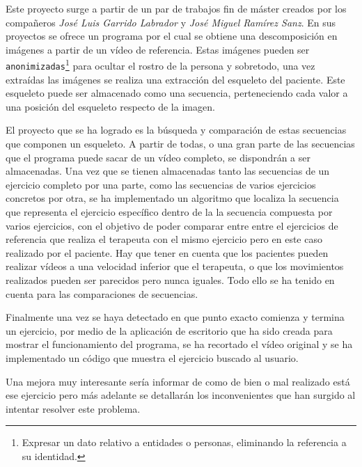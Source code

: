 Este proyecto surge a partir de un par de trabajos fin de máster creados por los compañeros \textit{José Luis Garrido Labrador} y \textit{José Miguel Ramírez Sanz}. En sus proyectos se ofrece un programa por el cual se obtiene una descomposición en imágenes a partir de un vídeo de referencia. Estas imágenes pueden ser \texttt{anonimizadas}\footnote{ Expresar un dato relativo a entidades o personas, eliminando la referencia a su identidad.} para ocultar el rostro de la persona y sobretodo, una vez extraídas las imágenes se realiza una extracción del esqueleto del paciente. Este esqueleto puede ser almacenado como una secuencia, perteneciendo cada valor a una posición del esqueleto respecto de la imagen. 

El proyecto que se ha logrado es la búsqueda y comparación de estas secuencias que componen un esqueleto. A partir de todas, o una gran parte de las secuencias que el programa puede sacar de un vídeo completo, se dispondrán a ser almacenadas. Una vez que se tienen almacenadas tanto las secuencias de un ejercicio completo por una parte, como las secuencias de varios ejercicios concretos por otra, se ha implementado un algoritmo que localiza la secuencia que representa el ejercicio específico dentro de la la secuencia compuesta por varios ejercicios, con el objetivo de poder comparar entre entre el ejercicios de referencia que realiza el terapeuta con el mismo ejercicio pero en este caso realizado por el paciente. Hay que tener en cuenta que los pacientes pueden realizar vídeos a una velocidad inferior que el terapeuta, o que los movimientos realizados pueden ser parecidos pero nunca iguales. Todo ello se ha tenido en cuenta para las comparaciones de secuencias.

Finalmente una vez se haya detectado en que punto exacto comienza y termina un ejercicio, por medio de la aplicación de escritorio que ha sido creada para mostrar el funcionamiento del programa, se ha recortado el vídeo original y se ha implementado un código que muestra el ejercicio buscado al usuario. 

Una mejora muy interesante sería informar de como de bien o mal realizado está ese ejercicio pero más adelante se detallarán los inconvenientes que han surgido al intentar resolver este problema.  
